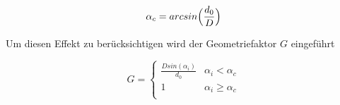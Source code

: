 \begin{equation}
    \alpha_c=arcsin\Bigl(\frac{d_0}{D}\Bigr)
\end{equation}

Um diesen Effekt zu berücksichtigen wird der Geometriefaktor \(G\) eingeführt

\begin{equation}
    G=
    \begin{cases}
        \frac{Dsin(\alpha_i)}{d_0}  &  \alpha_i < \alpha_c \\
        1                           & \alpha_i \ge \alpha_c \\

    \end{cases}
\end{equation}   


\cite{sample}
